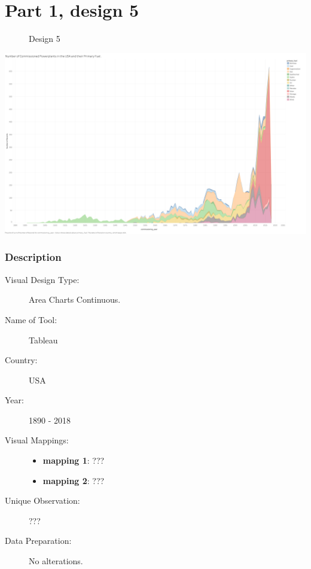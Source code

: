 \hypertarget{part-1-design-5}{%
\section{Part 1, design 5}\label{part-1-design-5}}

\begin{figure}
\centering
\caption{Design 5}
\end{figure}

\centering
\includegraphics[width=15cm]{Viz5.png}

\hypertarget{description}{%
\subsubsection{Description}\label{description}}

\begin{description}
\item[Visual Design Type:]
Area Charts Continuous.
\item[Name of Tool:]
Tableau
\item[Country:]
USA
\item[Year:]
1890 - 2018
\item[Visual Mappings:]
\begin{itemize}
\tightlist
\item
  \textbf{mapping 1}: ???
\end{itemize}

\begin{itemize}
\tightlist
\item
  \textbf{mapping 2}: ???
\end{itemize}
\item[Unique Observation:]
???
\item[Data Preparation:]
No alterations.
\end{description} 
